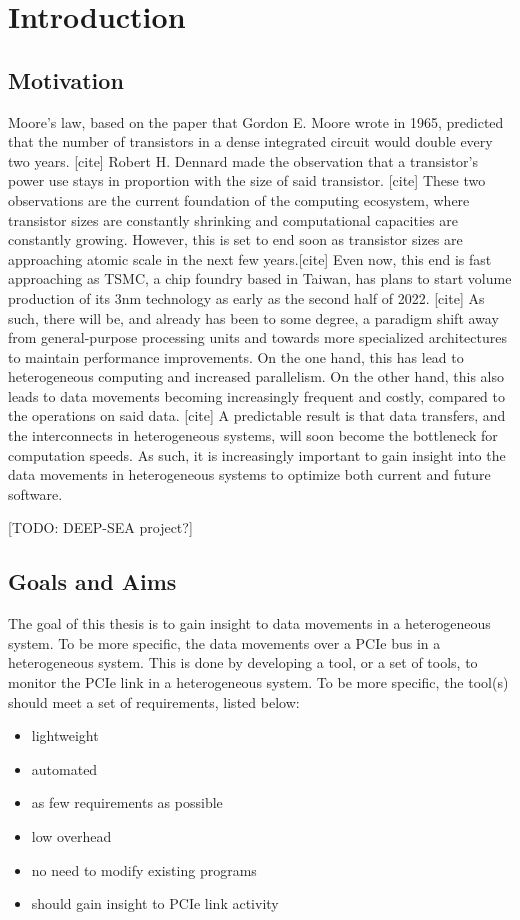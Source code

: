 
\chapter{Introduction}\label{chapter:introduction}

\section{Motivation}

Moore's law, based on the paper that Gordon E. Moore wrote in 1965, predicted that the number of transistors in a dense integrated circuit would double every two years. [cite] Robert H. Dennard made the observation that a transistor's power use stays in proportion with the size of said transistor. [cite] These two observations are the current foundation of the computing ecosystem, where transistor sizes are constantly shrinking and computational capacities are constantly growing. However, this is set to end soon as transistor sizes are approaching atomic scale in the next few years.[cite]  Even now, this end is fast approaching as TSMC, a chip foundry based in Taiwan, has plans to start volume production of its 3nm technology as early as the second half of 2022. [cite] As such, there will be, and already has been to some degree, a paradigm shift away from general-purpose processing units and towards more specialized architectures to maintain performance improvements. On the one hand, this has lead to heterogeneous computing and increased parallelism. On the other hand, this also leads to data movements becoming increasingly frequent and costly, compared to the operations on said data. [cite] A predictable result is that data transfers, and the interconnects in heterogeneous systems, will soon become the bottleneck for computation speeds. As such, it is increasingly important to gain insight into the data movements in heterogeneous systems to optimize both current and future software.

[TODO: DEEP-SEA project?]
\section{Goals and Aims}

The goal of this thesis is to gain insight to data movements in a heterogeneous system. To be more specific, the data movements over a PCIe bus in a heterogeneous system. This is done by developing a tool, or a set of tools, to monitor the PCIe link in a heterogeneous system. To be more specific, the tool(s) should meet a set of requirements, listed below: 
\begin{itemize}
\item lightweight
\item automated
\item as few requirements as possible
\item low overhead
\item no need to modify existing programs
\item should gain insight to PCIe link activity
\end{itemize}

